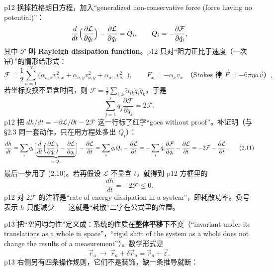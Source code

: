 \documentclass[11pt]{ctexart}
\begin{document}
p12 换掉拉格朗日方程，加入“generalized non-conservative force (force having no potential)”：
\[
\frac{d}{dt}\Bigl(\frac{\partial\mathcal{L}}{\partial\dot q_i}\Bigr)-\frac{\partial\mathcal{L}}{\partial q_i}=Q_i ,
\qquad Q_i=-\frac{\partial\mathcal{F}}{\partial\dot q_i},
\]
其中 $\mathcal{F}$ 叫 \textbf{Rayleigh dissipation function}。p12 只对“阻力正比于速度（一次幂）”的情形给形式：
\[
\mathcal{F}=\frac12\sum_{a=1}^{N}\bigl(\alpha_{a,x}v_{a,x}^2+\alpha_{a,y}v_{a,y}^2+\alpha_{a,z}v_{a,z}^2\bigr),
\qquad
F_x=-\alpha_xv_x\ \ \text{（Stokes 律 }\vec F=-6\pi\eta a\vec v\text{）},
\]
若坐标变换不显含时间，则 $\mathcal{F}=\frac12\sum_{i,k}\tilde\alpha_{ik}\dot q_i\dot q_k$，于是
\[
\sum_{j=1}^{s}\dot q_j\frac{\partial\mathcal{F}}{\partial\dot q_j}=2\mathcal{F}. \tag{2.10}
\]
p12 把 $dh/dt=-\partial\mathcal{L}/\partial t-2\mathcal{F}$ 这一行标了红字“goes without proof”。补证明（与 §2.3 同一套动作，只在用方程处多出 $Q_i$）：
\[
\frac{dh}{dt}
=\sum_i\dot q_i\Bigl[\underbrace{\frac{d}{dt}\Bigl(\frac{\partial\mathcal{L}}{\partial\dot q_i}\Bigr)-\frac{\partial\mathcal{L}}{\partial q_i}}_{=\,Q_i}\Bigr]-\frac{\partial\mathcal{L}}{\partial t}
=\sum_i\dot q_iQ_i-\frac{\partial\mathcal{L}}{\partial t}
=-\sum_i\dot q_i\frac{\partial\mathcal{F}}{\partial\dot q_i}-\frac{\partial\mathcal{L}}{\partial t}
=-2\mathcal{F}-\frac{\partial\mathcal{L}}{\partial t}. \tag{2.11}
\]
最后一步用了 (2.10)。若再假设 $\mathcal{L}$ 不显含 $t$，就得到 p12 方框里的
\[
\frac{dh}{dt}=-2\mathcal{F}\le0 .
\]
p12 对 $2\mathcal{F}$ 的注释是“rate of energy dissipation in a system”，即耗散功率。负号表示 $h$ 只能减少——这就是“耗散”二字在公式里的位置。





p13 把“空间均匀性”定义成：系统的性质在\textbf{整体平移}下不变（“invariant under its translations as a whole in space”，“rigid shift of the system as a whole does not change the results of a measurement”）。数学形式是
\[
\vec r_a\ \longrightarrow\ \vec r_a+\delta\vec r_a=\vec r_a+\vec\varepsilon .
\]
p13 右侧另有四条操作规则，它们不是装饰，缺一条推导就断：
\end{document}
